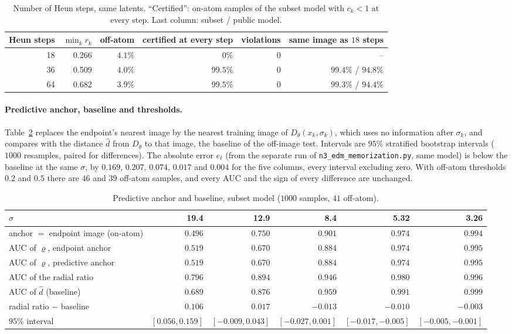 \documentclass{article} %
\theoremstyle{plain}
\theoremstyle{definition}
\theoremstyle{remark}
\begin{document}
\begin{table}[t]
\centering\small
\begin{tabular}{@{}rrrrrr@{}}
\toprule
Heun steps & $\min_kr_k$ & off-atom & certified at every step & violations & same image as $18$ steps\\
\midrule
18 & 0.266 & $4.1\%$ & $0\%$ & 0 & --\\
36 & 0.509 & $4.0\%$ & $99.5\%$ & 0 & $99.4\%$ / $94.8\%$\\
64 & 0.682 & $3.9\%$ & $99.5\%$ & 0 & $99.3\%$ / $94.4\%$\\
\bottomrule
\end{tabular}
\caption{Number of Heun steps, same latents. ``Certified'': on-atom samples of the subset model
with $c_k<1$ at every step. Last column: subset / public model.}
\label{tab:edm-steps}
\end{table}

\paragraph{Predictive anchor, baseline and thresholds.} Table~\ref{tab:edm-anchor} replaces the
endpoint's nearest image by the nearest training image of $D_\theta(x_k,\sigma_k)$, which uses no
information after $\sigma_k$, and compares with the distance $\hat d$ from $D_\theta$ to that image,
the baseline of the off-image test. Intervals are $95\%$ stratified bootstrap intervals ($1000$
resamples, paired for differences). The absolute error $e_t$ (from the separate run of
\texttt{n3\_edm\_memorization.py}, same model) is below the baseline at the same $\sigma$, by
$0.169$, $0.207$, $0.074$, $0.017$ and $0.004$ for the five columns, every interval excluding
zero. With off-atom thresholds $0.2$ and $0.5$ there are $46$ and $39$ off-atom samples, and every
AUC and the sign of every difference are unchanged.

\begin{table}[t]
\centering\footnotesize\setlength{\tabcolsep}{5pt}
\begin{tabular}{@{}lrrrrr@{}}
\toprule
$\sigma$ & 19.4 & 12.9 & 8.4 & 5.32 & 3.26\\
\midrule
anchor $=$ endpoint image (on-atom) & $0.496$ & $0.750$ & $0.901$ & $0.974$ & $0.994$\\
AUC of $\varrho$, endpoint anchor & $0.519$ & $0.670$ & $0.884$ & $0.974$ & $0.995$\\
AUC of $\varrho$, predictive anchor & $0.519$ & $0.670$ & $0.884$ & $0.974$ & $0.995$\\
AUC of the radial ratio & $0.796$ & $0.894$ & $0.946$ & $0.980$ & $0.996$\\
AUC of $\hat d$ (baseline) & $0.689$ & $0.876$ & $0.959$ & $0.991$ & $0.999$\\
radial ratio $-$ baseline & $0.106$ & $0.017$ & $-0.013$ & $-0.010$ & $-0.003$\\
\quad $95\%$ interval & $[0.056,0.159]$ & $[-0.009,0.043]$ & $[-0.027,0.001]$ & $[-0.017,-0.005]$ & $[-0.005,-0.001]$\\
\bottomrule
\end{tabular}
\caption{Predictive anchor and baseline, subset model ($1000$ samples, $41$ off-atom).}
\label{tab:edm-anchor}
\end{table}
\end{document}
